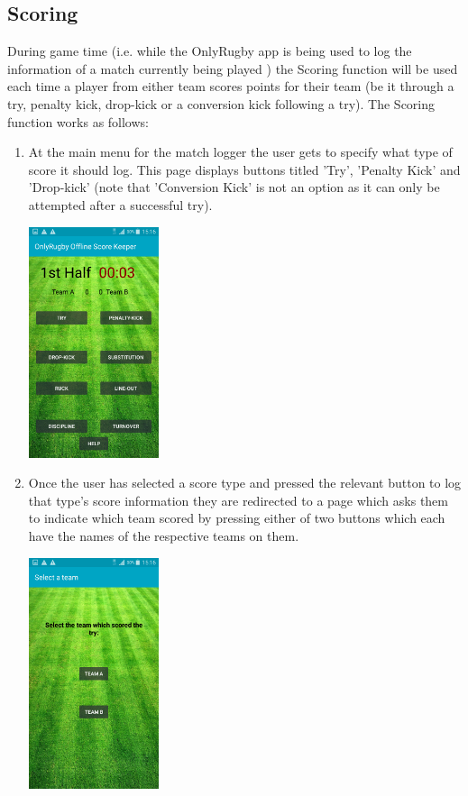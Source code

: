 \documentclass[hidelinks,a4paper,12pt]{article}
\begin{document}
	\subsection{Scoring}
		During game time (i.e. while the OnlyRugby app is being used to log the information of a match currently being played ) the Scoring function will be used each time a player from either team scores points for their team (be it through a try, penalty kick, drop-kick or a conversion kick following a try). The Scoring function works as follows:
		\begin{enumerate}
			\item At the main menu for the match logger the user gets to specify what type of score it should log. This page displays buttons titled 'Try', 'Penalty Kick' and  'Drop-kick' (note that 'Conversion Kick' is not an option as it can only be attempted after a successful try). 
		\begin{center}
	 	 	 \includegraphics[width=0.3\textwidth] {./images/game_menu.png}\\[0.4cm]
		\end{center}
			\item Once the user has selected a score type and pressed the relevant  button to log that type's score information they are redirected to a page which asks them to indicate which team scored by pressing either of two buttons which each have the names of the respective teams on them.
		\begin{center}
  			 \includegraphics[width=0.3\textwidth] {./images/choose_try_team.png}\\[0.4cm]

\end{center}
\end{enumerate}
\end{document}
